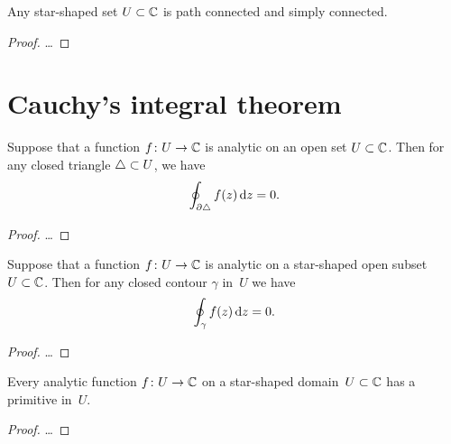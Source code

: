 \begin{lemma}
  \label{lem:star_shaped_implies_simply_connected}
  Any star-shaped set $U \subset \mathbb{C}$ is path connected and simply connected.
\end{lemma}
\begin{proof}
  \ldots
\end{proof}



\section{Cauchy's integral theorem}

\begin{lemma}
  \label{lem:goursat}
  Suppose that a function $f \colon U \to \mathbb{C}$ is analytic on an open
  set $U \subset \mathbb{C}$.
  Then for any closed triangle $\triangle \subset U$, we have
  \begin{align*}
    \oint_{\partial \triangle} f(z) \, \mathrm{d} z = 0 .
  \end{align*}
\end{lemma}
\begin{proof}
  \ldots
\end{proof}

\begin{theorem}
  \label{thm:cauchy_theorem_star_shaped}
  Suppose that a function $f \colon U \to \mathbb{C}$ is analytic on a
  star-shaped open subset $U \subset \mathbb{C}$.
  Then for any closed contour $\gamma$ in~$U$ we have
  \begin{align*}
    \oint_\gamma f(z) \, \mathrm{d} z = 0 .
  \end{align*}
\end{theorem}
\begin{proof}
  \ldots
\end{proof}

\begin{corollary}
  \label{cor:primitive_star_shaped}
  Every analytic function $f \colon U \to \mathbb{C}$ on a star-shaped
  domain~$U \subset \mathbb{C}$ has a primitive in~$U$.
\end{corollary}
\begin{proof}
  \ldots
\end{proof}

